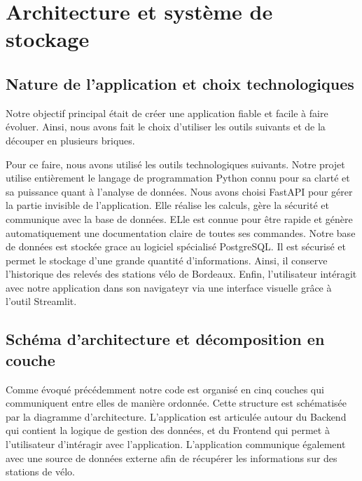\documentclass[
  french,
  11pt,
  a4paper,
]{article}
\begin{document}
\pagebreak

\section{Architecture et système de
stockage}\label{architecture-et-systuxe8me-de-stockage}

\subsection{Nature de l'application et choix
technologiques}\label{nature-de-lapplication-et-choix-technologiques}

Notre objectif principal était de créer une application fiable et facile
à faire évoluer. Ainsi, nous avons fait le choix d'utiliser les outils
suivants et de la découper en plusieurs briques.

Pour ce faire, nous avons utilisé les outils technologiques suivants.
Notre projet utilise entièrement le langage de programmation Python
connu pour sa clarté et sa puissance quant à l'analyse de données. Nous
avons choisi FastAPI pour gérer la partie invisible de l'application.
Elle réalise les calculs, gère la sécurité et communique avec la base de
données. ELle est connue pour être rapide et génère automatiquement une
documentation claire de toutes ses commandes. Notre base de données est
stockée grace au logiciel spécialisé PostgreSQL. Il est sécurisé et
permet le stockage d'une grande quantité d'informations. Ainsi, il
conserve l'historique des relevés des stations vélo de Bordeaux. Enfin,
l'utilisateur intéragit avec notre application dans son navigateyr via
une interface visuelle grâce à l'outil Streamlit.

\subsection{Schéma d'architecture et décomposition en
couche}\label{schuxe9ma-darchitecture-et-duxe9composition-en-couche}

Comme évoqué précédemment notre code est organisé en cinq couches qui
communiquent entre elles de manière ordonnée. Cette structure est
schématisée par la diagramme d'architecture. L'application est articulée
autour du Backend qui contient la logique de gestion des données, et du
Frontend qui permet à l'utilisateur d'intéragir avec l'application.
L'application communique également avec une source de données externe
afin de récupérer les informations sur des stations de vélo.
\end{document}
